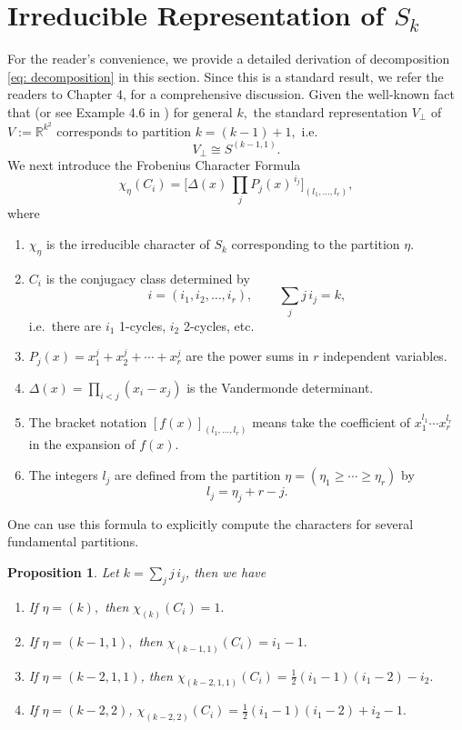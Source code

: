 \documentclass{amsart}%
\newtheorem{proposition}[theorem]{Proposition}
\begin{document}
\section{Irreducible Representation of \texorpdfstring{$S_k$}{Sk}}\label{app:A2}
For the reader’s convenience, we provide a detailed derivation of decomposition \eqref{eq: decomposition} in this section. Since this is a standard result, we refer the readers to \cite{fulton2013representation} Chapter 4, for a comprehensive discussion. Given the well-known fact that (or see Example 4.6 in \cite{fulton2013representation}) for general $k,$ the standard representation $V_{\perp}$ of $V:=\mathbb R^{k^2}$ corresponds to partition $k=(k-1)+1,$ i.e. 
\[
V_{\perp}\cong S^{(k-1,1)}.
\]
We next introduce the Frobenius Character Formula
\begin{equation}\label{eq:frobenius}
\chi_\eta(C_i)
= 
\bigl[
\Delta(x)\,
\prod_{j} P_j(x)^{\,i_j}
\bigr]_{(l_1,\dots,l_r)},
\end{equation}
where
\begin{enumerate}
\item $\chi_\eta$ is the irreducible character of $S_k$ corresponding to the partition $\eta$.
\item $C_i$ is the conjugacy class determined by 
      \[
      i = (i_1, i_2, \dots,i_r), \qquad \sum_j j\,i_j = k,
      \]
      i.e.\ there are $i_1$ 1-cycles, $i_2$ 2-cycles, etc.
\item $P_j(x) = x_1^j + x_2^j + \cdots + x_r^j$ are the power sums in $r$ independent variables.
\item $\Delta(x) = \prod_{i<j}(x_i - x_j)$ is the Vandermonde determinant.
\item The bracket notation $[f(x)]_{(l_1,\dots,l_r)}$
      means take the coefficient of $x_1^{l_1}\cdots x_r^{l_r}$ in the expansion of $f(x)$.
\item The integers $l_j$ are defined from the partition $\eta = (\eta_1 \ge \cdots \ge \eta_r)$ by
      \[
      l_j = \eta_j + r - j.
      \]
\end{enumerate}
One can use this formula to explicitly compute the characters for several fundamental partitions.
\begin{proposition}\label{prop: frobenius} Let $k = \sum_j j\,i_j$, then we have
  \begin{enumerate}
      \item[(a)] If $\eta = (k),$ then $\chi_{(k)}(C_i) = 1.$
      \item[(b)] If $\eta = (k-1,1),$ then $\chi_{(k-1,1)}(C_i) = i_1 - 1.$ 
      \item[(c)] If $\eta= (k-2,1,1)$, then $\chi_{(k-2,1,1)}(C_i)=\frac{1}{2}(i_1-1)(i_1-2) - i_2.$
      \item[(d)] If $\eta = (k-2,2)$,
$\chi_{(k-2,2)}(C_i)
=
\frac{1}{2}(i_1-1)(i_1-2) + i_2 - 1.$
  \end{enumerate}  
\end{proposition}
\end{document}
